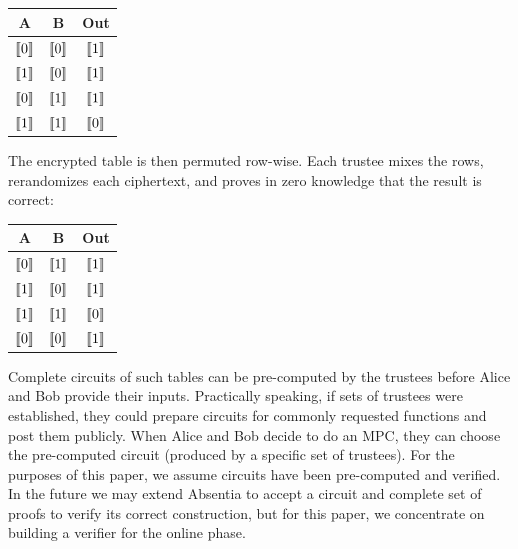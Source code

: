\begin{center}
\begin{tabular}{|c|c|c|}
  \hline
  A			& 	B			& 	Out   			\\ \hline
  $\llbracket 0 \rrbracket$ 	&	$\llbracket 0 \rrbracket$ 	& 	$\llbracket 1 \rrbracket$ 	\\ \hline
  $\llbracket 1 \rrbracket$ 	&	$\llbracket 0 \rrbracket$ 	&  	$\llbracket 1 \rrbracket$ 	\\ \hline
  $\llbracket 0 \rrbracket$ 	&	$\llbracket 1 \rrbracket$ 	& 	$\llbracket 1 \rrbracket$ 	\\ \hline
  $\llbracket 1 \rrbracket$ 	&	$\llbracket 1 \rrbracket$ 	&  	$\llbracket 0 \rrbracket$ 	\\ \hline
\end{tabular}
\end{center}

The encrypted table is then permuted row-wise. Each trustee mixes the rows, rerandomizes each ciphertext, and proves in zero knowledge that the result is correct: 

\begin{center}
\begin{tabular}{|c|c|c|}
  \hline
  A			& 	B			& 	Out   			\\ \hline
  $\llbracket 0 \rrbracket$ 	&	$\llbracket 1 \rrbracket$ 	& 	$\llbracket 1 \rrbracket$ 	\\ \hline
  $\llbracket 1 \rrbracket$ 	&	$\llbracket 0 \rrbracket$ 	&  	$\llbracket 1 \rrbracket$ 	\\ \hline
  $\llbracket 1 \rrbracket$ 	&	$\llbracket 1 \rrbracket$ 	&  	$\llbracket 0 \rrbracket$ 	\\ \hline
  $\llbracket 0 \rrbracket$ 	&	$\llbracket 0 \rrbracket$ 	& 	$\llbracket 1 \rrbracket$ 	\\ \hline
\end{tabular}
\end{center}

Complete circuits of such tables can be pre-computed by the trustees before Alice and Bob provide their inputs. Practically speaking, if sets of trustees were established, they could prepare circuits for commonly requested functions and post them publicly. When Alice and Bob decide to do an MPC, they can choose the pre-computed circuit (produced by a specific set of trustees). For the purposes of this paper, we assume circuits have been pre-computed and verified. In the future we may extend Absentia to accept a circuit and complete set of proofs to verify its correct construction, but for this paper, we concentrate on building a verifier for the online phase.


